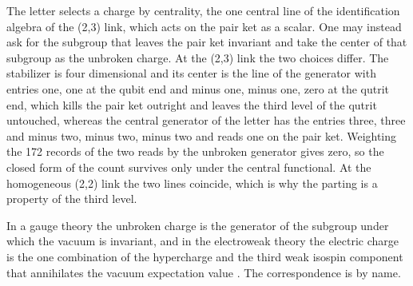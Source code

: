 The letter selects a charge by centrality, the one central line of the identification algebra of the (2,3) link, which acts on the pair ket as a scalar. One may instead ask for the subgroup that leaves the pair ket invariant and take the center of that subgroup as the unbroken charge. At the (2,3) link the two choices differ. The stabilizer is four dimensional and its center is the line of the generator with entries one, one at the qubit end and minus one, minus one, zero at the qutrit end, which kills the pair ket outright and leaves the third level of the qutrit untouched, whereas the central generator of the letter has the entries three, three and minus two, minus two, minus two and reads one on the pair ket. Weighting the 172 records of the two reads by the unbroken generator gives zero, so the closed form of the count survives only under the central functional. At the homogeneous (2,2) link the two lines coincide, which is why the parting is a property of the third level.
\begin{chbridge}
In a gauge theory the unbroken charge is the generator of the subgroup under which the vacuum is invariant, and in the electroweak theory the electric charge is the one combination of the hypercharge and the third weak isospin component that annihilates the vacuum expectation value \cite{Weinberg1967,Peskin1995}. The correspondence is by name.
\end{chbridge}

